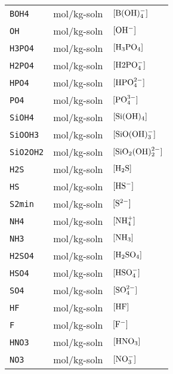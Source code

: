 \documentclass[article,nojss]{jss}
\begin{document}
\begin{footnotesize}
\begin{longtable}{l|l|p{7cm}}
\texttt{BOH4}        & mol/kg-soln                     & $[\rm B(OH)_4^-]$\\                     
\texttt{OH}          & mol/kg-soln                     & $[\rm OH^-]$\\         
\texttt{H3PO4}       & mol/kg-soln                     & $[\rm H_3PO_4]$\\         
\texttt{H2PO4}       & mol/kg-soln                     & $[\rm H2PO_4^-]$\\                    
\texttt{HPO4}        & mol/kg-soln                     & $[\rm HPO_4^{2-}]$\\         
\texttt{PO4}         & mol/kg-soln                     & $[\rm PO_4^{3-}]$\\         
\texttt{SiOH4}       & mol/kg-soln                     & $[\rm Si(OH)_4]$\\                    
\texttt{SiOOH3}      & mol/kg-soln                     & $[\rm SiO(OH)_3^-]$\\         
\texttt{SiO2OH2}     & mol/kg-soln                     & $[\rm SiO_2(OH)_2^{2-}]$\\         
\texttt{H2S}         & mol/kg-soln                     & $[\rm H_2S]$\\                      
\texttt{HS}          & mol/kg-soln                     & $[\rm HS^-]$\\         
\texttt{S2min}       & mol/kg-soln                     & $[\rm S^{2-}]$\\         
\texttt{NH4}         & mol/kg-soln                     & $[\rm NH_4^+]$\\                      
\texttt{NH3}         & mol/kg-soln                     & $[\rm NH_3]$\\         
\texttt{H2SO4}       & mol/kg-soln                     & $[\rm H_2SO_4]$\\         
\texttt{HSO4}        & mol/kg-soln                     & $[\rm HSO_4^-]$\\                     
\texttt{SO4}         & mol/kg-soln                     & $[\rm SO_4^{2-}]$\\         
\texttt{HF}          & mol/kg-soln                     & $[\rm HF]$\\         
\texttt{F}           & mol/kg-soln                     & $[\rm F^-]$\\                        
\texttt{HNO3}        & mol/kg-soln                     & $[\rm HNO_3]$\\
\texttt{NO3}         & mol/kg-soln                     & $[\rm NO_3^-]$\\         

\end{longtable}
\end{footnotesize}
\end{document}

